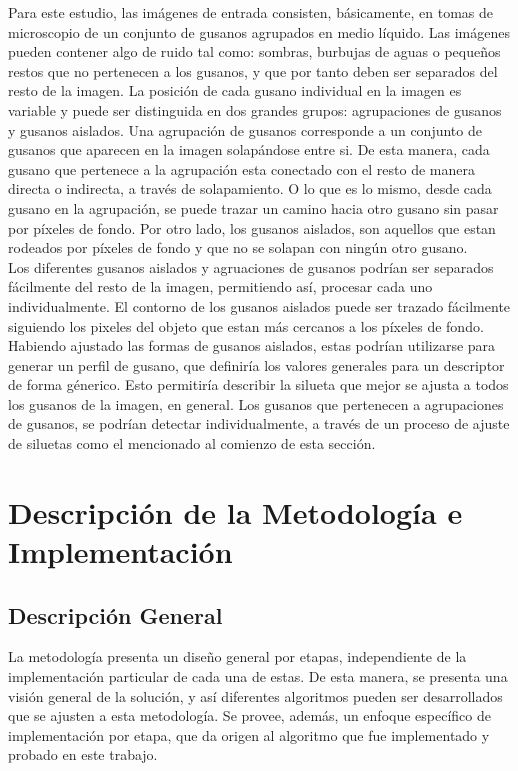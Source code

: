 Para este estudio, las im\'agenes de entrada consisten, b\'asicamente, en
tomas de microscopio de un conjunto de gusanos agrupados en medio 
l\'iquido. Las im\'agenes pueden contener algo de ruido tal como: 
sombras, burbujas de aguas o peque\~nos restos que no pertenecen a
los gusanos, y que por tanto deben ser separados del resto de la imagen. La
posici\'on de cada gusano individual en la imagen es variable y puede
ser distinguida en dos grandes grupos: agrupaciones de gusanos y gusanos aislados.
Una agrupaci\'on de gusanos corresponde a un conjunto de gusanos que aparecen en la
imagen solap\'andose entre si. De esta manera, cada gusano que pertenece
a la agrupaci\'on esta conectado con el resto de manera directa o indirecta,
 a trav\'es de solapamiento. O lo que es lo mismo, desde cada gusano en la agrupaci\'on,
se puede trazar un camino hacia otro gusano sin pasar por p\'ixeles de fondo.  
Por otro lado, los gusanos aislados, son aquellos que estan rodeados por
p\'ixeles de fondo y que no se solapan con ning\'un otro gusano.\\

Los diferentes gusanos aislados y agruaciones de gusanos podr\'ian ser
separados f\'acilmente del resto de la imagen, permitiendo as\'i, 
procesar cada uno individualmente. El contorno de los gusanos aislados
puede ser trazado f\'acilmente siguiendo los pixeles del objeto que
estan m\'as cercanos a los p\'ixeles de fondo. Habiendo ajustado las formas
de gusanos aislados, estas podr\'ian utilizarse para generar un perfil
de gusano, que definir\'ia los valores generales para un descriptor de forma
g\'enerico. Esto permitir\'ia describir la silueta que mejor se ajusta a todos
los gusanos de la imagen, en general.
Los gusanos que pertenecen a agrupaciones de gusanos, se podr\'ian detectar
individualmente, a trav\'es de un proceso de ajuste de siluetas como
el mencionado al comienzo de esta secci\'on.

\section{Descripci\'on de la Metodolog\'ia e Implementaci\'on}
\label{met:description}

\subsection{Descripci\'on General}

La metodolog\'ia presenta un dise\~no general por etapas, 
independiente de la implementaci\'on particular de cada una de estas. De esta
manera, se presenta una visi\'on general de la soluci\'on, y as\'i diferentes
algoritmos pueden ser desarrollados que se ajusten a esta metodolog\'ia.
Se provee, adem\'as, un enfoque espec\'ifico de implementaci\'on por etapa, que da
origen al algoritmo que fue implementado y probado en este trabajo.\\

